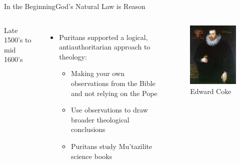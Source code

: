 \begin{frame}{In the Beginning}{God's Natural Law is Reason}
	\begin{columns}[c]
			Late 1500's to mid 1600's
			\begin{itemize}
				\item Puritans supported a logical, antiauthoritarian approach to theology:
					\begin{itemize}
						\item Making your own observations from the Bible and not relying on the Pope
						\item Use observations to draw broader theological conclusions
						\item Puritans study Mu'tazilite science books
					\end{itemize}
			\end{itemize}
			\begin{figure}
				\centering
				\includegraphics[width=\textwidth]{images/edward_coke.png}
				\caption{Edward Coke}
			\end{figure}
	\end{columns}
\end{frame}



